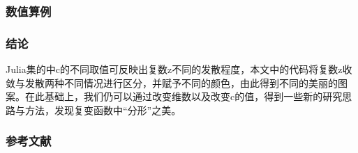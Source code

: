 \documentclass[UTF8]{beamer}
\begin{document}
	\begin{frame}
		\frametitle{数值算例}
		\begin{figure}[ht]
			\centering
		\end{figure}
	\end{frame}
	\begin{frame}
		\frametitle{结论}
		Julia集的中c的不同取值可反映出复数z不同的发散程度，本文中的代码将复数z收敛与发散两种不同情况进行区分，并赋予不同的颜色，由此得到不同的美丽的图案。在此基础上，我们仍可以通过改变维数以及改变c的值，得到一些新的研究思路与方法，发现复变函数中“分形”之美。
	\end{frame}
	\begin{frame}
		\frametitle{参考文献}
		
		
	\end{frame}
\end{document}
